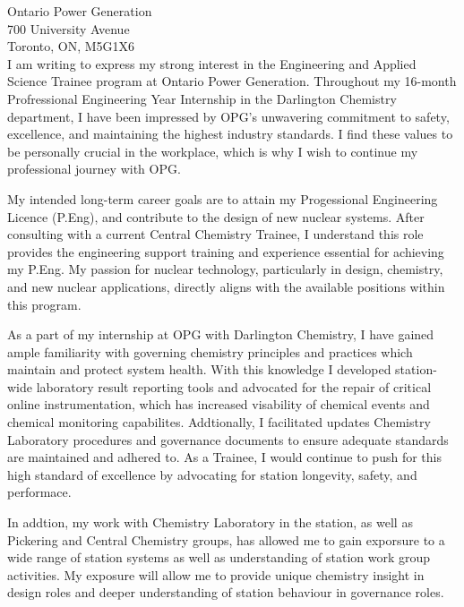 \documentclass[11pt]{FDUletter}
\begin{document}
\begin{letter}{
    Ontario Power Generation \\
    700 University Avenue\\
    Toronto, ON, M5G1X6 \\
}
I am writing to express my strong interest in the Engineering and Applied Science Trainee program at Ontario Power Generation. Throughout my 16-month Profressional Engineering Year Internship in the Darlington Chemistry department, I have been impressed by OPG's unwavering commitment to safety, excellence, and maintaining the highest industry standards. I find these values to be personally crucial in the workplace, which is why I wish to continue my professional journey with OPG.



My intended long-term career goals are to attain my Progessional Engineering Licence (P.Eng), and contribute to the design of new nuclear systems. After consulting with a current Central Chemistry Trainee, I understand this role provides the engineering support training and experience essential for achieving my P.Eng. My passion for nuclear technology, particularly in design, chemistry, and new nuclear applications, directly aligns with the available positions within this program.

As a part of my internship at OPG with Darlington Chemistry, I have gained ample familiarity with governing chemistry principles and practices which maintain and protect system health. With this knowledge I developed station-wide laboratory result reporting tools and advocated for the repair of critical online instrumentation, which has increased visability of chemical events and chemical monitoring capabilites. Addtionally, I facilitated updates Chemistry Laboratory procedures and governance documents to ensure adequate standards are maintained and adhered to. As a Trainee, I would continue to push for this high standard of excellence by advocating for station longevity, safety, and performace.

In addtion, my work with Chemistry Laboratory in the station, as well as Pickering and Central Chemistry groups, has allowed me to gain exporsure to a wide range of station systems as well as understanding of station work group activities. My exposure will allow me to provide unique chemistry insight in design roles and deeper understanding of station behaviour in governance roles.


\end{letter}
\end{document}
